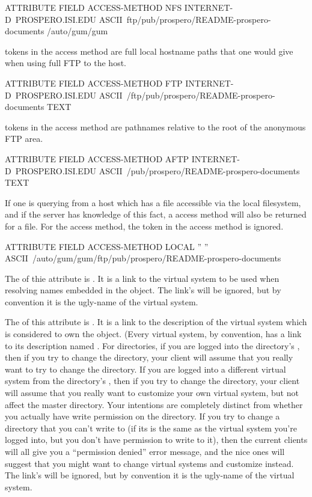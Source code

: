 \begin{description}
\begin{command}
ATTRIBUTE FIELD ACCESS-METHOD NFS INTERNET-D~PROSPERO.ISI.EDU
	ASCII~\mbox{ftp/pub/prospero/README-prospero-documents}
	 \mbox{/auto/gum/gum}

{\rm \par {} tokens in the  access method are full
local hostname paths that one would give when using full FTP to the host.}

ATTRIBUTE FIELD ACCESS-METHOD FTP INTERNET-D~PROSPERO.ISI.EDU
	ASCII~\mbox{/ftp/pub/prospero/README-prospero-documents} TEXT

{\rm \par {} tokens in the  access method are
pathnames relative to the root of the anonymous FTP area.}

ATTRIBUTE FIELD ACCESS-METHOD AFTP INTERNET-D~PROSPERO.ISI.EDU
	ASCII~\mbox{/pub/prospero/README-prospero-documents} TEXT 

{\rm If one is querying from a host which has a file accessible via
the local filesystem, and if the server has knowledge of this fact, a
 access method will also be returned for a file.  For the
 access method, the  token in the access
method is ignored.}

ATTRIBUTE FIELD ACCESS-METHOD LOCAL '' ''
	ASCII~\mbox{/auto/gum/gum/ftp/pub/prospero/README-prospero-documents}

\end{command}


\item[\atr{closure}]  The  of thie attribute is
.  It is a link to the virtual system to be
used when resolving names embedded in the object.  The link's
 will be ignored, but by convention it is the
ugly-name of the virtual system.

\item[\atr{owning-virtual-system}]  The  of this
attribute is .  It is a link to the description of the
virtual system which is considered to own the object.  (Every virtual
system, by convention, has a link to its description named
.   For directories, if you are logged into
the directory's , then if you try to change
the directory, your client will assume that you really want to try to
change the directory.  If you are logged into a different virtual
system from the directory's , then if you
try to change the directory, your client will assume that you really
want to customize your own virtual system, but not affect the master
directory.  Your intentions are completely distinct from whether you
actually have write permission on the directory.  If you try to change
a directory that you can't write to (if its  is
the same as the virtual system you're logged into, but you don't have
permission to write to it), then the current clients will all give you
a ``permission denied'' error message, and the nice ones will suggest
that you might want to change virtual systems and customize instead.
The link's  will be ignored, but by convention it is the
ugly-name of the virtual system.


\end{description}
